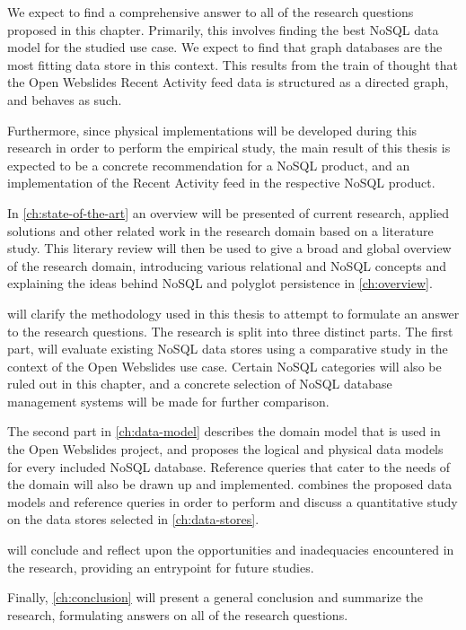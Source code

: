 We expect to find a comprehensive answer to all of the research questions proposed in this chapter.
Primarily, this involves finding the best NoSQL data model for the studied use case.
We expect to find that graph databases are the most fitting data store in this context.
This results from the train of thought that the Open Webslides Recent Activity feed data is structured as a directed graph, and behaves as such.

Furthermore, since physical implementations will be developed during this research in order to perform the empirical study, the main result of this thesis is expected to be a concrete recommendation for a NoSQL product, and an implementation of the Recent Activity feed in the respective NoSQL product.

In \cref{ch:state-of-the-art} an overview will be presented of current research, applied solutions and other related work in the research domain based on a literature study.
This literary review will then be used to give a broad and global overview of the research domain, introducing various relational and NoSQL concepts and explaining the ideas behind NoSQL and polyglot persistence in \cref{ch:overview}.

 will clarify the methodology used in this thesis to attempt to formulate an answer to the research questions.
The research is split into three distinct parts.
The first part,  will evaluate existing NoSQL data stores using a comparative study in the context of the Open Webslides use case.
Certain NoSQL categories will also be ruled out in this chapter, and a concrete selection of NoSQL database management systems will be made for further comparison.

The second part in \cref{ch:data-model} describes the domain model that is used in the Open Webslides project, and proposes the logical and physical data models for every included NoSQL database.
Reference queries that cater to the needs of the domain will also be drawn up and implemented.
 combines the proposed data models and reference queries in order to perform and discuss a quantitative study on the data stores selected in \cref{ch:data-stores}.

 will conclude and reflect upon the opportunities and inadequacies encountered in the research, providing an entrypoint for future studies.

Finally, \cref{ch:conclusion} will present a general conclusion and summarize the research, formulating answers on all of the research questions.

